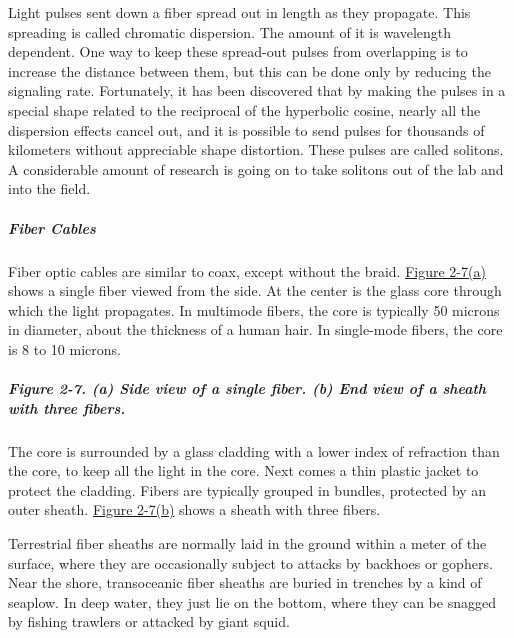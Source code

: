\documentclass[b5paper,11pt]{memoir}
\begin{document}
Light pulses sent down a fiber spread out in length as they propagate.
This spreading is called {chromatic dispersion}. The amount of it is
wavelength dependent. One way to keep these spread-out pulses from
overlapping is to increase the distance between them, but this can be
done only by reducing the signaling rate. Fortunately, it has been
discovered that by making the pulses in a special shape related to the
reciprocal of the hyperbolic cosine, nearly all the dispersion effects
cancel out, and it is possible to send pulses for thousands of
kilometers without appreciable shape distortion. These pulses are called
{solitons}. A considerable amount of research is going on to take
solitons out of the lab and into the field.

\protect\hypertarget{0130661023_ch02lev1sec2.htmlux5cux23ch02lev3sec2}{}{}

\subparagraph{Fiber Cables}

Fiber optic cables are similar to coax, except without the braid.
\protect\hyperlink{0130661023_ch02lev1sec2.htmlux5cux23ch02fig07}{Figure
2-7(a)} shows a single fiber viewed from the side. At the center is the
glass core through which the light propagates. In multimode fibers, the
core is typically 50 microns in diameter, about the thickness of a human
hair. In single-mode fibers, the core is 8 to 10 microns.

\subparagraph[Figure 2-7. (a) Side view of a single fiber. (b) End view
of a sheath with three
fibers.]{\texorpdfstring{\protect\hypertarget{0130661023_ch02lev1sec2.htmlux5cux23ch02fig07}{}{}Figure
2-7. (a) Side view of a single fiber. (b) End view of a sheath with
three
fibers.}{Figure 2-7. (a) Side view of a single fiber. (b) End view of a sheath with three fibers.}}


The core is surrounded by a glass cladding with a lower index of
refraction than the core, to keep all the light in the core. Next comes
a thin plastic jacket to protect the cladding. Fibers are typically
grouped in bundles, protected by an outer sheath.
\protect\hyperlink{0130661023_ch02lev1sec2.htmlux5cux23ch02fig07}{Figure
2-7(b)} shows a sheath with three fibers.

Terrestrial fiber sheaths are normally laid in the ground within a meter
of the surface, where they are occasionally subject to attacks by
backhoes or gophers. Near the shore, transoceanic fiber sheaths are
buried in trenches by a kind of seaplow. In deep water, they just lie on
the bottom, where they can be snagged by fishing trawlers or attacked by
giant squid.
\end{document}
